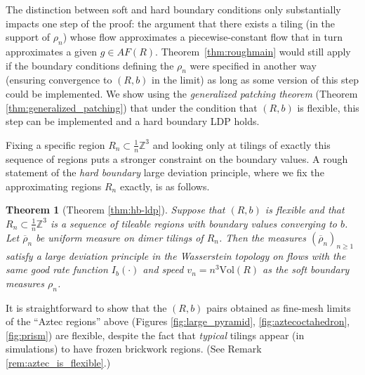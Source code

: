 \documentclass[11pt]{article}
\newtheorem{thm}{Theorem}[subsection]
\theoremstyle{remark}
\theoremstyle{definition}
\newcommand{\m}[1]{\mathbb{#1}}
\begin{document}
The distinction between soft and hard boundary conditions only substantially impacts one step of the proof: the argument that there exists a tiling (in the support of $\rho_n$) whose flow approximates a piecewise-constant flow that in turn approximates a given $g \in AF(R)$. Theorem~\ref{thm:roughmain} would still apply if the boundary conditions defining the $\rho_n$ were specified in another way (ensuring convergence to $(R,b)$ in the limit) as long as some version of this step could be implemented. We show using the \textit{generalized patching theorem} (Theorem \ref{thm:generalized_patching}) that under the condition that $(R,b)$ is flexible, this step can be implemented and a hard boundary LDP holds. 

Fixing a specific region $R_n\subset \frac{1}{n}\m Z^3$ and looking only at tilings of exactly this sequence of regions puts a stronger constraint on the boundary values. A rough statement of the \textit{hard boundary} large deviation principle, where we fix the approximating regions $R_n$ exactly, is as follows.

\begin{thm}[Theorem \ref{thm:hb-ldp}]\label{thm:roughmain-hb}
    Suppose that $(R,b)$ is flexible and that $R_n\subset \frac{1}{n}\m Z^3$ is a sequence of tileable regions with boundary values converging to $b$. Let $\overline \rho_n$ be uniform measure on dimer tilings of $R_n$. Then the measures $(\overline{\rho}_n)_{n\geq 1}$ satisfy a large deviation principle in the Wasserstein topology on flows with the same good rate function $I_b(\cdot)$ and speed $v_n = n^3 \text{Vol}(R)$ as the soft boundary measures $\rho_n$. 
\end{thm}

It is straightforward to show that the $(R,b)$ pairs obtained as fine-mesh limits of the ``Aztec regions'' above (Figures \ref{fig:large_pyramid}, \ref{fig:aztecoctahedron}, \ref{fig:prism}) are flexible, despite the fact that {\em typical} tilings appear (in simulations) to have frozen brickwork regions. (See Remark \ref{rem:aztec_is_flexible}.)
\end{document}
